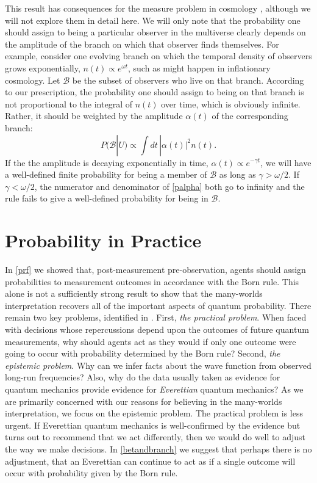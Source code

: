 \documentclass[onecolumn,secnumarabic,amsmath,amssymb,balancelastpage,nofootinbib]{article}
\begin{document}
This result has consequences for the measure problem in cosmology \citep{Freivogel:2011eg, Salem:2011qz, Vilenkin:2013ik}, although we will not explore them in detail here. We will only note that the probability one should assign to being a particular observer in the multiverse clearly depends on the amplitude of the branch on which that observer finds themselves. For example, consider one evolving branch on which the temporal density of observers grows exponentially, $n(t) \propto e^{\omega t}$, such as might happen in inflationary cosmology.  Let $\mathcal{B}$ be the subset of observers who live on that branch.  According to our prescription, the probability one should assign to being on that branch is not proportional to the integral of $n(t)$ over time, which is obviously infinite. Rather, it should be weighted by the amplitude $\alpha(t)$ of the corresponding branch:
\begin{equation}
  P(\mathcal{B}|U) \propto \int dt\, |\alpha(t)|^2 n(t). 
\end{equation}
If the the amplitude is decaying exponentially in time, $\alpha(t) \propto e^{-\gamma t}$, we will have a well-defined finite probability for being a member of $\mathcal{B}$ as long as $\gamma > \omega/2$.  If $\gamma < \omega/2$, the numerator and denominator of \eqref{palpha} both go to infinity and the rule fails to give a well-defined probability for being in $\mathcal{B}$.

\section{Probability in Practice}\label{pinp}

In \textsection \ref{prf} we showed that, post-measurement pre-observation, agents should assign probabilities to measurement outcomes in accordance with the Born rule.  This alone is not a sufficiently strong result to show that the many-worlds interpretation recovers all of the important aspects of quantum probability.  There remain two key problems, identified in \citet{papineau, greaves2007b}.  First, \emph{the practical problem}.  When faced with decisions whose repercussions depend upon the outcomes of future quantum measurements, why should agents act as they would if only one outcome were going to occur with probability determined by the Born rule?  Second, \emph{the epistemic problem}.  Why can we infer facts about the wave function from observed long-run frequencies?  Also, why do the data usually taken as evidence for quantum mechanics provide evidence for \emph{Everettian} quantum mechanics?  As we are primarily concerned with our reasons for believing in the many-worlds interpretation, we focus on the epistemic problem.  The practical problem is less urgent.  If Everettian quantum mechanics is well-confirmed by the evidence but turns out to recommend that we act differently, then we would do well to adjust the way we make decisions. In \textsection \ref{betandbranch} we suggest that perhaps there is no adjustment, that an Everettian can continue to act as if a single outcome will occur with probability given by the Born rule.
\end{document}
